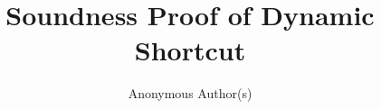 \documentclass[11pt]{article}
\begin{document}
\title{Soundness Proof of Dynamic Shortcut}

\author{Anonymous Author(s)}
\date{}

\maketitle


\end{document}
